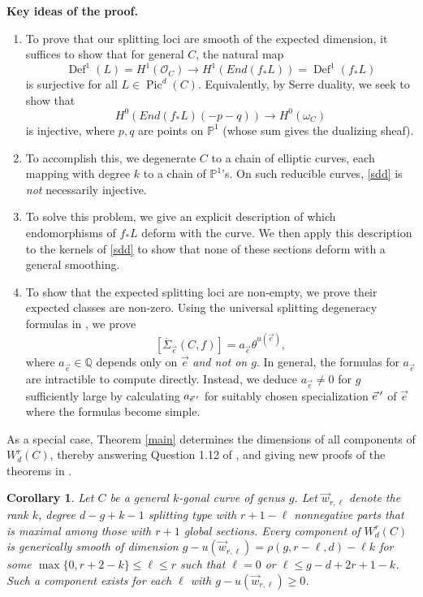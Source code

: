 \documentclass[12pt]{amsart}
\newcommand{\qq}{\mathbb{Q}}
\newcommand{\pp}{\mathbb{P}}
\renewcommand{\O}{\mathscr{O}}
\newtheorem{Corollary}[theorem]{Corollary}
\DeclareMathOperator{\Pic}{Pic}
\DeclareMathOperator{\Def}{Def}
\newcommand{\ee}{{\vec{e}} \nobreak\hspace{.16667em plus .08333em}'}
\newcommand{\Sigmabar}{\overline{\Sigma}}
\theoremstyle{definition}
\theoremstyle{remark}
\theoremstyle{remark}
\numberwithin{equation}{section}
\begin{document}
\vspace{.1in}
\noindent
\textbf{Key ideas of the proof.}
\begin{enumerate}

\item To prove that our splitting loci are smooth of the expected dimension,
it suffices to show that for general $C$, the natural map
\[\Def^1(L) = H^1(\O_C) \rightarrow H^1(End(f_*L)) = \Def^1(f_*L)\]
is surjective for all $L \in \Pic^d(C)$.
Equivalently, by Serre duality, we seek to show that
\begin{equation} \label{sdd}
H^0(End(f_*L)(-p-q)) \to H^0(\omega_C)
\end{equation}
is injective, where $p, q$ are points on $\pp^1$
(whose sum gives the dualizing sheaf).

\item To accomplish this, we degenerate $C$ to a chain of elliptic curves, each mapping with degree $k$ to a chain of $\pp^1$'s.
On such reducible curves, \eqref{sdd} is \emph{not} necessarily injective.

\item To solve this problem,
we give an explicit description
of which endomorphisms of $f_* L$ deform with the curve.
We then apply this description to the kernels of \eqref{sdd} to show
that none of these sections deform with a general smoothing.

\item To show that the expected splitting loci are non-empty, we prove their expected classes are non-zero.
Using the universal splitting degeneracy formulas in \cite{L}, we prove
\[[\Sigmabar_{\vec{e}}(C, f)] = a_{\vec{e}} \theta^{u(\vec{e})},\]
where $a_{\vec{e}} \in \qq$ depends only on $\vec{e}$ \textit{and not on $g$}.
In general, the formulas for $a_{\vec{e}}$ are intractible to compute directly.
Instead, we deduce $a_{\vec{e}} \neq 0$ for $g$ sufficiently large by calculating $a_{\ee}$ for suitably chosen specialization $\ee$ of $\vec{e}$ where the formulas become simple.
\end{enumerate}
\vspace{.1in}

As a special case, Theorem \ref{main} determines the dimensions of all components of $W^r_d(C)$, thereby answering Question 1.12 of \cite{Pf}, and giving new proofs of the theorems in \cite{JR, Pf}.
\begin{Corollary} \label{cor}
Let $C$ be a general $k$-gonal curve of genus $g$. Let $\vec{w}_{r, \ell}$ denote the rank $k$, degree $d - g +k-1$ splitting type with $r+1 - \ell$ nonnegative parts that is maximal among those with $r+1$ global sections.
Every component of $W^r_d(C)$ is generically smooth of dimension $g - u(\vec{w}_{r,\ell}) = \rho(g, r - \ell, d) - \ell k $ for some $\max\{0, r + 2 - k\} \leq \ell \leq r$ such that $\ell = 0$ or $\ell \leq  g - d + 2r + 1 - k$.
Such a component exists for each $\ell$ with $g - u(\vec{w}_{r,\ell})  \geq 0$.
\end{Corollary}
\end{document}
